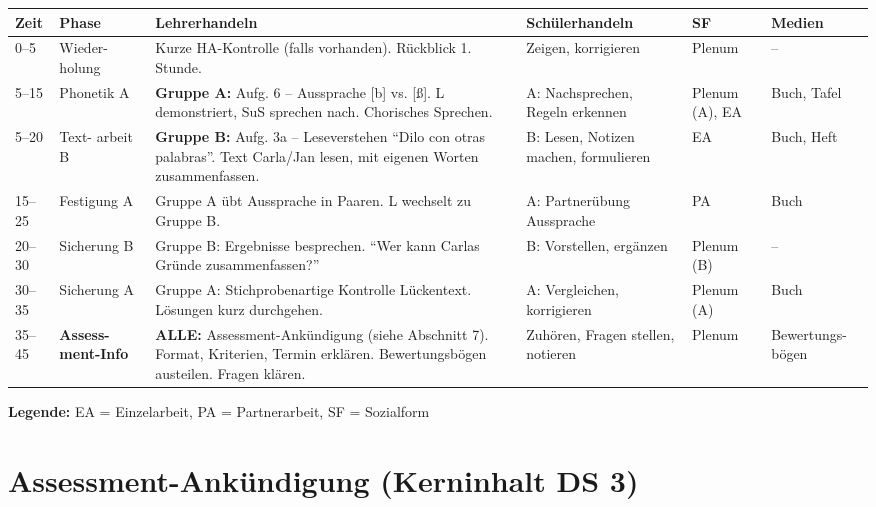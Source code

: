 \documentclass[11pt,a4paper]{article}
\begin{document}
\begin{longtable}{|p{0.8cm}|p{1.5cm}|p{4.5cm}|p{3cm}|p{1.3cm}|p{1.8cm}|}
\hline
\textbf{Zeit} & \textbf{Phase} & \textbf{Lehrerhandeln} & \textbf{Schülerhandeln} & \textbf{SF} & \textbf{Medien} \\
\hline
\endhead

0--5 & Wieder- holung & Kurze HA-Kontrolle (falls vorhanden). Rückblick 1. Stunde. & Zeigen, korrigieren & Plenum & -- \\
\hline

5--15 & Phonetik A & \textbf{Gruppe A:} Aufg. 6 -- Aussprache [b] vs. [\ss]. L demonstriert, SuS sprechen nach. Chorisches Sprechen. & A: Nachsprechen, Regeln erkennen & Plenum (A), EA & Buch, Tafel \\
\hline

5--20 & Text- arbeit B & \textbf{Gruppe B:} Aufg. 3a -- Leseverstehen ``Dilo con otras palabras''. Text Carla/Jan lesen, mit eigenen Worten zusammenfassen. & B: Lesen, Notizen machen, formulieren & EA & Buch, Heft \\
\hline

15--25 & Festigung A & Gruppe A übt Aussprache in Paaren. L wechselt zu Gruppe B. & A: Partnerübung Aussprache & PA & Buch \\
\hline

20--30 & Sicherung B & Gruppe B: Ergebnisse besprechen. ``Wer kann Carlas Gründe zusammenfassen?'' & B: Vorstellen, ergänzen & Plenum (B) & -- \\
\hline

30--35 & Sicherung A & Gruppe A: Stichprobenartige Kontrolle Lückentext. Lösungen kurz durchgehen. & A: Vergleichen, korrigieren & Plenum (A) & Buch \\
\hline

\rowcolor{lightgray}
35--45 & \textbf{Assess- ment-Info} & \textcolor{fach}{\textbf{ALLE:}} Assessment-Ankündigung (siehe Abschnitt 7). Format, Kriterien, Termin erklären. Bewertungsbögen austeilen. Fragen klären. & Zuhören, Fragen stellen, notieren & Plenum & Bewertungs- bögen \\
\hline
\end{longtable}

\textbf{Legende:} EA = Einzelarbeit, PA = Partnerarbeit, SF = Sozialform

\section{Assessment-Ankündigung (Kerninhalt DS 3)}
\end{document}
